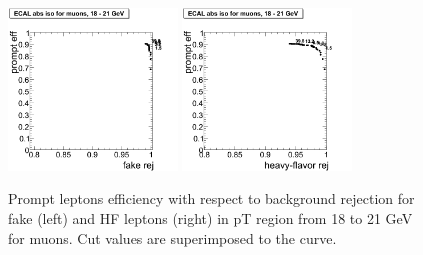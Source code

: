 \begin{figure}[htbp]
\begin{center}
 \includegraphics[width = 0.4\textwidth]{pictures/trackCut/bkgdRej_sigEff/muon_fake_ptCut5_ptCut6.png}
\includegraphics[width = 0.4\textwidth]{pictures/trackCut/bkgdRej_sigEff/muon_nonPrompt_ptCut5_ptCut6.png}
\caption{\small{Prompt leptons efficiency with respect to background 
rejection for fake (left) and HF leptons (right) in pT region
from 18 to 21 GeV for muons. 
Cut values are superimposed to the curve.}\label{fig:ecalrej_mu6}}
\end{center}
\end{figure}

